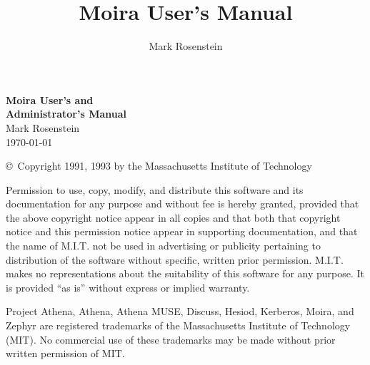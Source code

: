 \documentclass{book}
\begin{document}
\newcommand{\athena}{\PSbox{tech-plan/owl.PS hscale=0.1 vscale=0.1}{7pt}{7pt}}
\title{Moira User's Manual}
\author{Mark Rosenstein}

\begin{titlepage}
\vspace{1 in}
 \hfill
{}

\vspace*{2.5in}
\hfill {\Huge \bf Moira User's and\\[.25in]
\hspace*{\fill} Administrator's Manual}\\

\vspace*{2in}
{\LARGE \hfill Mark Rosenstein\\[.25in] 
\hspace*{\fill} \today\\}
\end{titlepage}
\cfoot{}
\setlength{\headrulewidth}{0pt}
\setcounter{page}{2}
\renewcommand{\thepage}{\roman{page}}

\vspace*{3in}
\copyright\ Copyright 1991, 1993 by the Massachusetts Institute of Technology

Permission to use, copy, modify, and distribute this
software and its documentation for any purpose and without
fee is hereby granted, provided that the above copyright
notice appear in all copies and that both that copyright
notice and this permission notice appear in supporting
documentation, and that the name of M.I.T. not be used in
advertising or publicity pertaining to distribution of the
software without specific, written prior permission.
M.I.T. makes no representations about the suitability of
this software for any purpose.  It is provided ``as is''
without express or implied warranty.

Project Athena, Athena, Athena MUSE, Discuss, Hesiod, Kerberos, Moira,
and Zephyr are registered trademarks of the Massachusetts Institute of
Technology (MIT).  No commercial use of these trademarks may be made
without prior written permission of MIT.

\newpage
\rhead{Page \thepage}
\setlength{\headrulewidth}{0.4pt}
\cfoot{}
\rfoot{\today}
\tableofcontents
\newpage
\end{document}
